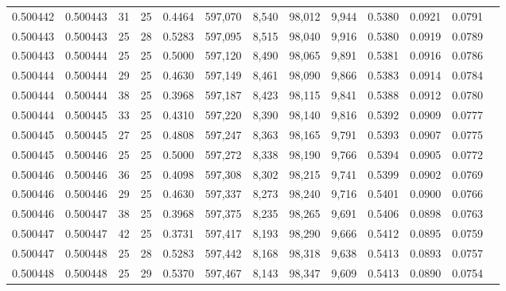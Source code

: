 \begin{tabular}{rrrrrrrrrrrrr}
0.500442 & 0.500443 &    31 &  25 &                                     0.4464 & 597,070 &   8,540 &  98,012 &   9,944 & 0.5380 & 0.0921 & 0.0791 \\
0.500443 & 0.500443 &    25 &  28 &                                     0.5283 & 597,095 &   8,515 &  98,040 &   9,916 & 0.5380 & 0.0919 & 0.0789 \\
0.500443 & 0.500444 &    25 &  25 &                                     0.5000 & 597,120 &   8,490 &  98,065 &   9,891 & 0.5381 & 0.0916 & 0.0786 \\
0.500444 & 0.500444 &    29 &  25 &                                     0.4630 & 597,149 &   8,461 &  98,090 &   9,866 & 0.5383 & 0.0914 & 0.0784 \\
0.500444 & 0.500444 &    38 &  25 &                                     0.3968 & 597,187 &   8,423 &  98,115 &   9,841 & 0.5388 & 0.0912 & 0.0780 \\
0.500444 & 0.500445 &    33 &  25 &                                     0.4310 & 597,220 &   8,390 &  98,140 &   9,816 & 0.5392 & 0.0909 & 0.0777 \\
0.500445 & 0.500445 &    27 &  25 &                                     0.4808 & 597,247 &   8,363 &  98,165 &   9,791 & 0.5393 & 0.0907 & 0.0775 \\
0.500445 & 0.500446 &    25 &  25 &                                     0.5000 & 597,272 &   8,338 &  98,190 &   9,766 & 0.5394 & 0.0905 & 0.0772 \\
0.500446 & 0.500446 &    36 &  25 &                                     0.4098 & 597,308 &   8,302 &  98,215 &   9,741 & 0.5399 & 0.0902 & 0.0769 \\
0.500446 & 0.500446 &    29 &  25 &                                     0.4630 & 597,337 &   8,273 &  98,240 &   9,716 & 0.5401 & 0.0900 & 0.0766 \\
0.500446 & 0.500447 &    38 &  25 &                                     0.3968 & 597,375 &   8,235 &  98,265 &   9,691 & 0.5406 & 0.0898 & 0.0763 \\
0.500447 & 0.500447 &    42 &  25 &                                     0.3731 & 597,417 &   8,193 &  98,290 &   9,666 & 0.5412 & 0.0895 & 0.0759 \\
0.500447 & 0.500448 &    25 &  28 &                                     0.5283 & 597,442 &   8,168 &  98,318 &   9,638 & 0.5413 & 0.0893 & 0.0757 \\
0.500448 & 0.500448 &    25 &  29 &                                     0.5370 & 597,467 &   8,143 &  98,347 &   9,609 & 0.5413 & 0.0890 & 0.0754 \\

\end{tabular}
